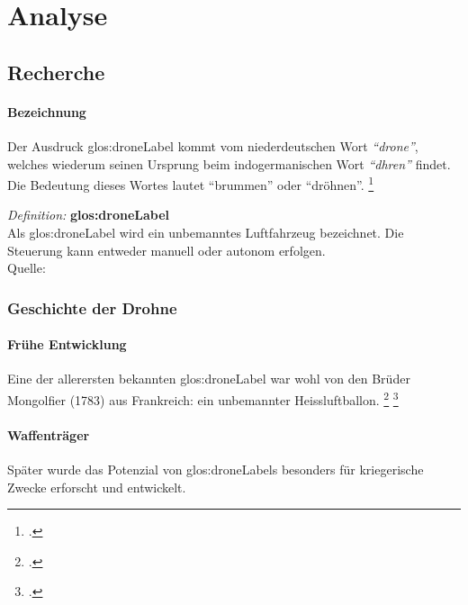 \chapter{Analyse}

\section{Recherche}
\label{sec:recherche}

\subsubsection{Bezeichnung}
Der Ausdruck \gls{glos:droneLabel} kommt vom niederdeutschen Wort \textit{"`drone"'}, welches wiederum seinen Ursprung beim indogermanischen Wort \textit{"`dhren"'} findet. Die Bedeutung dieses Wortes lautet "`brummen"' oder "`dröhnen"'. \footcite{Geschichte_der_Drohne_-_Nachrichten_Print_-_DIE_WELT_-_Wissen_Print_DW_-_DIE_WELT_2015-03-21}

\begin{framed}
	\textit{Definition: }\textbf{\gls{glos:droneLabel}}\\
	Als \gls{glos:droneLabel} wird ein unbemanntes Luftfahrzeug bezeichnet. Die Steuerung kann entweder manuell oder autonom erfolgen.\\
	Quelle:
\end{framed}

\subsection{Geschichte der Drohne}

\subsubsection{Frühe Entwicklung}
Eine der allerersten bekannten \gls{glos:droneLabel} war wohl von den Brüder Mongolfier (1783) aus Frankreich: ein unbemannter Heissluftballon. \footcite{Kleine_Geschichte_der_Drohnen_-_Nachrichten_Print_-_WELT_KOMPAKT_-_Lifestyle_-_DIE_WELT_2015-03-21}
\footcite{Unbemannte_Luftfahrt__Wikipedia_2015-03-22}

\subsubsection{Waffenträger}
Später wurde das Potenzial von \glspl{glos:droneLabel} besonders für kriegerische Zwecke erforscht und entwickelt.

